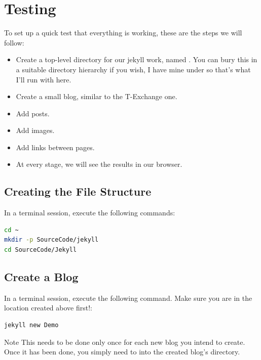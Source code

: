\chapter{Testing}\label{chap: Testing}

To set up a quick test that everything is working, these are the steps we will follow:

\begin{itemize}
    \item Create a top-level directory for our jekyll work, named . You can bury this in a suitable directory hierarchy if you wish, I have mine under  so that's what I'll run with here.
    \item Create a small blog, similar to the T-Exchange one.
    \item Add posts.
    \item Add images.
    \item Add links between pages.
    \item At every stage, we will see the results in our browser.
\end{itemize}

\section{Creating the File Structure}\label{sect: Create the file structure}

In a terminal session, execute the following commands:

\begin{lstlisting}[style=myStyle,language=bash]
cd ~
mkdir -p SourceCode/jekyll
cd SourceCode/Jekyll
\end{lstlisting}


\section{Create a Blog}\label{sect: Create a Blog}

In a terminal session, execute the following command. Make sure you are in the location created above first!:

\begin{lstlisting}[style=myStyle,language=bash]
jekyll new Demo
\end{lstlisting}

\eject
\begin{tips}{Note}
    This needs to be done only once for each new blog you intend to create. Once it has been done, you simply need to  into the created blog's directory.
\end{tips}

